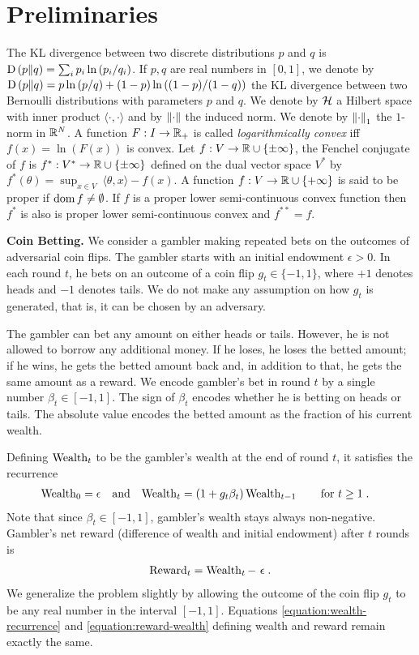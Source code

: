 \section{Preliminaries}
\label{section:preliminaries}

The \ac{KL} divergence between two discrete distributions $p$ and $q$ is
$\operatorname{D}\left({p}\middle\|{q}\right) = \sum_{i} p_i \ln\left( p_i/q_i \right)$. If $p,q$ are real numbers
in $[0,1]$, we denote by $\operatorname{D}\left({p}\middle\|{q}\right) = p \ln \left(p/q \right) + (1-p) \ln
\left((1-p)/(1-q) \right)$ the \ac{KL} divergence between two Bernoulli
distributions with parameters $p$ and $q$.  We denote by $\mathcal{H}$ a Hilbert space
with inner product $\langle \cdot, \cdot\rangle$ and by $\left\|{\cdot}\right\|$ the
induced norm.  We denote by $\left\|{\cdot}\right\|_1$ the $1$-norm in $\mathbb{R}^N$.  A
function $F:I \to \mathbb{R}_+$ is called \emph{logarithmically convex} iff $f(x) =
\ln(F(x))$ is convex.  Let $f:V \to \mathbb{R} \cup \{\pm\infty\}$, the Fenchel
conjugate of $f$ is $f^*:V^* \to \mathbb{R} \cup \{\pm \infty\}$ defined on the dual
vector space $V^*$ by $f^*(\theta) = \sup_{x \in V} \ \langle \theta, x \rangle
- f(x)$.  A function $f:V \to \mathbb{R} \cup \{+ \infty\}$ is said to be proper if
$\operatorname*{dom} f \neq \emptyset$.  If $f$ is a proper lower semi-continuous convex
function then $f^*$ is also is proper lower semi-continuous convex and
$f^{**}=f$.

\textbf{Coin Betting.} We consider a gambler making
repeated bets on the outcomes of adversarial coin flips. The gambler starts with an
initial endowment $\epsilon > 0$. In each round $t$, he bets on an outcome of a
coin flip $g_t \in \{-1,1\}$, where $+1$ denotes heads and $-1$ denotes tails.
We do not make any assumption on how $g_t$ is generated, that is, it can be
chosen by an adversary.

The gambler can bet any amount on either heads or tails. However, he is not
allowed to borrow any additional money. If he loses, he loses the betted
amount; if he wins, he gets the betted amount back and, in addition to that, he
gets the same amount as a reward.  We encode gambler's bet in round $t$ by a
single number $\beta_t \in [-1,1]$. The sign of $\beta_t$ encodes whether he is
betting on heads or tails. The absolute value encodes the betted amount as the
fraction of his current wealth.

Defining $\operatorname{Wealth}_t$ to be the gambler's wealth at the end of round $t$, it satisfies the
recurrence
\begin{align}
\label{equation:wealth-recurrence}
\operatorname{Wealth}_0 & = \epsilon &
& \text{and} &
\operatorname{Wealth}_t & = (1 + g_t \beta_t) \operatorname{Wealth}_{t-1} \qquad \text{for $t \ge 1$} \; .
\end{align}
Note that since $\beta_t \in [-1,1]$, gambler's wealth stays always non-negative.
Gambler's net reward (difference of wealth and initial endowment) after $t$
rounds is
\begin{align}
\label{equation:reward-wealth}
\operatorname{Reward}_t = \operatorname{Wealth}_t - \ \epsilon \; .
\end{align}
We generalize the problem slightly by allowing the outcome of the coin flip
$g_t$ to be any real number in the interval $[-1,1]$.  Equations
\eqref{equation:wealth-recurrence} and \eqref{equation:reward-wealth} defining
wealth and reward remain exactly the same.
